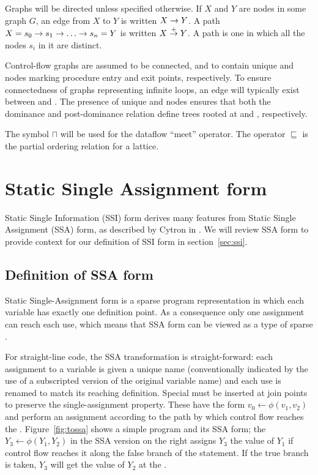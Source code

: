 \documentclass[12pt,titlepage,twoside]{article}
\newcommand{\meet}{\ensuremath{\sqcap}}
\newcommand{\latleq}{\ensuremath{\sqsubseteq}}
\let\oldsection\section
\renewcommand{\section}{\setcounter{figure}{0}\setcounter{table}{0}\oldsection}
\begin{document}
Graphs will be directed unless specified otherwise.  If $X$ and $Y$
are nodes in some graph $G$, an edge from $X$ to $Y$ is written
$X \rightarrow Y$. A path \mbox{$X=s_0\rightarrow s_1\rightarrow \ldots \rightarrow s_n=Y$} is
written $X \stackrel{+}{\rightarrow} Y$.  A  path is one in which all
the nodes $s_i$ in it are distinct.

Control-flow graphs are assumed to be connected, and to contain unique
 and  nodes marking procedure entry and exit
points, respectively.  To ensure connectedness of graphs representing
infinite loops, an edge will typically exist between  and
.  The presence of unique  and  nodes
ensures that both the dominance and post-dominance relation define
trees rooted at  and , respectively.

The symbol $\meet$ will be used for the dataflow ``meet'' operator.
The operator $\latleq$ is the %
partial ordering relation for a lattice.

\section{Static Single Assignment form}\label{sec:ssa}
Static Single Information (SSI) form derives many features from Static
Single Assignment (SSA) form, as described by Cytron in
\cite{cytron89:ssa}.  We will review SSA form to provide context for
our definition of SSI form in section~\ref{sec:ssi}.

\subsection{Definition of SSA form}

Static Single-Assignment form is a sparse program representation in
which each variable has exactly one definition point.  As a
consequence only one assignment can reach each use, which means that
SSA form can be viewed as a type of sparse 
\cite{aho88:dragon}.

For straight-line code, the SSA transformation is straight-forward:
each assignment to a variable is given a unique name (conventionally
indicated by the use of a subscripted version of the original variable
name) and each use is renamed to match its reaching definition.
Special  must be inserted at join points to
preserve the single-assignment property.  These  have
the form $v_0\gets\phi(v_1,v_2)$ and perform an assignment
according to the path by which control flow reaches the \phifunction.
Figure~\vref{fig:tossa} shows a simple program and its SSA form; the
\phifunction $Y_3\gets\phi(Y_1,Y_2)$ in the SSA version on the
right assigns $Y_3$ the value of $Y_1$ if control flow reaches it
along the false branch of the  statement.  If the true branch
is taken, $Y_3$ will get the value of $Y_2$ at the \phifunction.
\end{document}
